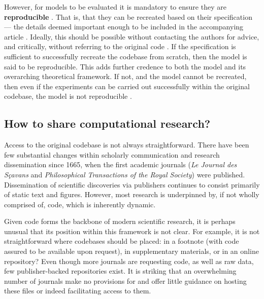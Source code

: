 \documentclass[jou]{apa6}
\begin{document}
However, for models to be evaluated
it is mandatory to ensure they are \textbf{reproducible} \cite{topalidou15}.  
That is, that they can be recreated based on their specification --- the details deemed important enough to be included in the accompanying article \cite{hinsen15}.
Ideally, this should be possible without contacting the authors for advice, and critically, without referring to the original code \cite{cooper14}.
If the specification is sufficient to successfully recreate the codebase from scratch, then the model is said to be reproducible.
This adds further credence to both the model and its overarching theoretical framework.
If not, and the model cannot be recreated, then even if the experiments can be carried out successfully within the original codebase, the model is not reproducible \cite{crook13}.

\subsection*{How to share computational research?}
Access to the original codebase is not always straightforward.
There have been few substantial changes within scholarly communication and research dissemination since 1665, when the first academic journals (\textit{Le Journal des Sçavans} and \textit{Philosophical Transactions of the Royal Society}) were published.
Dissemination of scientific discoveries via publishers continues to consist primarily of static text and figures.
However, most research is underpinned by, if not wholly comprised of, code, which is inherently dynamic.

Given code forms the backbone of modern scientific research, it is perhaps unusual that its position within this framework is not clear.
For example, it is not straightforward where codebases should be placed: in a footnote (with code assured to be available upon request), in supplementary materials, or in an online repository?
Even though more journals are requesting code, as well as raw data, few publisher-backed repositories exist.
It is striking that an overwhelming number of journals make no provisions for and offer little guidance on hosting these files or indeed facilitating access to them.
\end{document}
